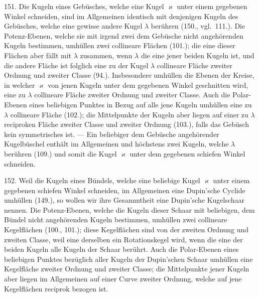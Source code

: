 151. Die Kugeln eines Geb\"usches, welche eine Kugel $\varkappa$
unter einem gegebenen Winkel schneiden, sind im Allgemeinen
identisch mit denjenigen Kugeln des Geb\"usches,
welche eine gewisse andere Kugel $\lambda$ ber\"uhren (150., vgl.\ 111.).
Die Potenz-Ebenen, welche sie mit irgend zwei dem Geb\"usche
nicht angeh\"orenden Kugeln bestimmen, umh\"ullen zwei collineare
Fl\"achen (101.); die eine dieser Fl\"achen aber f\"allt mit
$\lambda$ zusammen, wenn $\lambda$ die eine jener beiden Kugeln ist, und
die andere Fl\"ache ist folglich eine zu der Kugel $\lambda$ collineare
Fl\"ache zweiter Ordnung und zweiter Classe (94.). Insbesondere
umh\"ullen die Ebenen der Kreise, in welcher $\varkappa$ von
jenen Kugeln unter dem gegebenen Winkel geschnitten wird,
eine zu $\lambda$ collineare Fl\"ache zweiter Ordnung und zweiter
Classe. Auch die Polar-Ebenen eines beliebigen Punktes
in Bezug auf alle jene Kugeln umh\"ullen eine zu $\lambda$ collineare
Fl\"ache (102.); die Mittelpunkte der Kugeln aber liegen auf
einer zu $\lambda$ reciproken Fl\"ache zweiter Classe und zweiter
Ordnung (103.), falls das Geb\"usch kein symmetrisches ist. --- Ein
beliebiger dem Geb\"usche angeh\"orender Kugelb\"uschel
enth\"alt im Allgemeinen und h\"ochstens zwei Kugeln, welche
$\lambda$ ber\"uhren (109.) und somit die Kugel $\varkappa$ unter dem gegebenen
schiefen Winkel schneiden.


152. Weil die Kugeln eines B\"undels, welche eine beliebige
Kugel $\varkappa$ unter einem gegebenen schiefen Winkel
schneiden, im Allgemeinen eine Dupin'sche Cyclide umh\"ullen
(149.), so wollen wir ihre Gesammtheit eine {\glqq}Dupin'sche
Kugelschaar{\grqq} nennen. Die Potenz-Ebenen, welche die Kugeln
dieser Schaar mit beliebigen, dem B\"undel nicht angeh\"orenden
Kugeln bestimmen, umh\"ullen zwei collineare Kegelfl\"achen
(100., 101.); diese Kegelfl\"achen sind von der zweiten Ordnung
und zweiten Classe, weil eine derselben ein Rotationskegel
wird, wenn die eine der beiden Kugeln alle Kugeln der
Schaar ber\"uhrt. Auch die Polar-Ebenen eines beliebigen
Punktes bez\"uglich aller Kugeln der Dupin'schen Schaar umh\"ullen
eine Kegelfl\"ache zweiter Ordnung und zweiter Classe;
die Mittelpunkte jener Kugeln aber liegen im Allgemeinen
auf einer Curve zweiter Ordnung, welche auf jene Kegelfl\"achen
reciprok bezogen ist.

\begin{center}
\makebox[15em]{\hrulefill}
\end{center}


